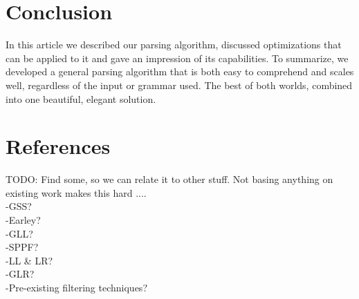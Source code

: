 \documentclass[a4paper,10pt]{article}
\begin{document}
\section{Conclusion}

In this article we described our parsing algorithm, discussed optimizations that can be applied to it and gave an impression of its capabilities. To summarize, we developed a general parsing algorithm that is both easy to comprehend and scales well, regardless of the input or grammar used. The best of both worlds, combined into one beautiful, elegant solution.

\section{References}

TODO: Find some, so we can relate it to other stuff. Not basing anything on existing work makes this hard ....\\
-GSS?\\
-Earley?\\
-GLL?\\
-SPPF?\\
-LL \& LR?\\
-GLR?\\
-Pre-existing filtering techniques?
\end{document}
